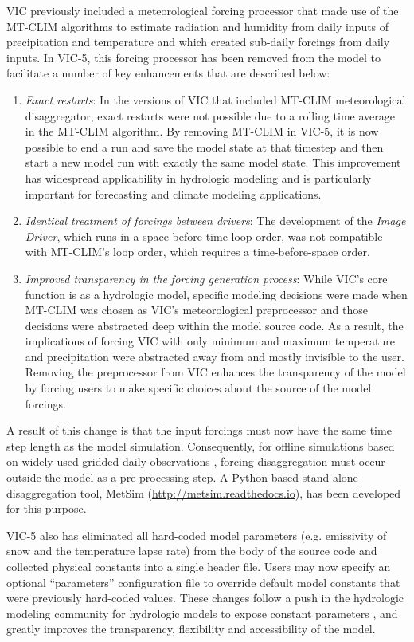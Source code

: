 \documentclass[gmd, manuscript]{copernicus}
\begin{document}
    VIC previously included a meteorological forcing processor that made use of the MT-CLIM algorithms to estimate radiation and humidity from daily inputs of precipitation and temperature and which created sub-daily forcings from daily inputs. In VIC-5, this forcing processor has been removed from the model to facilitate a number of key enhancements that are described below:

    \begin{enumerate}
      \item \textit{Exact restarts}: In the versions of VIC that included MT-CLIM meteorological disaggregator, exact restarts were not possible due to a rolling time average in the MT-CLIM algorithm. By removing MT-CLIM in VIC-5, it is now possible to end a run and save the model state at that timestep and then start a new model run with exactly the same model state. This improvement has widespread applicability in hydrologic modeling and is particularly important for forecasting and climate modeling applications.
      \item \textit{Identical treatment of forcings between drivers}: The development of the \textit{Image Driver}, which runs in a space-before-time loop order, was not compatible with MT-CLIM's loop order, which requires a time-before-space order.
      \item \textit{Improved transparency in the forcing generation process}: While VIC's core function is as a hydrologic model, specific modeling decisions were made when MT-CLIM was chosen as VIC's meteorological preprocessor and those decisions were abstracted deep within the model source code. As a result, the implications of forcing VIC with only minimum and maximum temperature and precipitation were abstracted away from and mostly invisible to the user. Removing the preprocessor from VIC enhances the transparency of the model by forcing users to make specific choices about the source of the model forcings.
    \end{enumerate}

    A result of this change is that the input forcings must now have the same time step length as the model simulation.  Consequently, for offline simulations based on widely-used gridded daily observations \citep[e.g.][]{Livneh_2015}, forcing disaggregation must occur outside the model as a pre-processing step.  A Python-based stand-alone disaggregation tool, MetSim (\url{http://metsim.readthedocs.io}), has been developed for this purpose.

    VIC-5 also has eliminated all hard-coded model parameters (e.g. emissivity of snow and the temperature lapse rate) from the body of the source code and collected physical constants into a single header file. Users may now specify an optional ``parameters'' configuration file to override default model constants that were previously hard-coded values. These changes follow a push in the hydrologic modeling community for hydrologic models to expose constant parameters \citep[e.g.][]{Mendoza_2015}, and greatly improves the transparency, flexibility and accessibility of the model.
\end{document}

